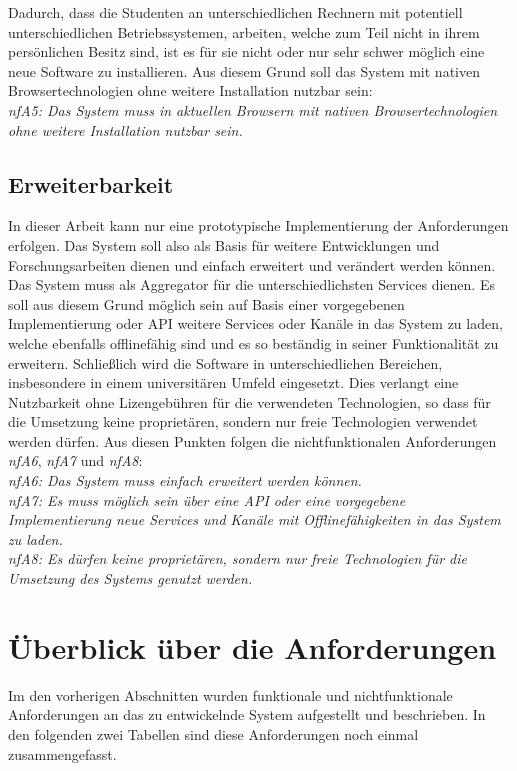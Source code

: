 Dadurch, dass die Studenten an unterschiedlichen Rechnern mit potentiell unterschiedlichen Betriebssystemen, arbeiten, welche zum Teil nicht in ihrem persönlichen Besitz sind, ist es für sie nicht oder nur sehr schwer möglich eine neue Software zu installieren. Aus diesem Grund soll das System mit nativen Browsertechnologien ohne weitere Installation nutzbar sein:\\
\emph{nfA5: Das System muss in aktuellen Browsern mit nativen Browsertechnologien ohne weitere Installation nutzbar sein.}

\subsection{Erweiterbarkeit}
In dieser Arbeit kann nur eine prototypische Implementierung der Anforderungen erfolgen. Das System soll also als Basis für weitere Entwicklungen und Forschungsarbeiten dienen und einfach erweitert und verändert werden können. Das System muss als Aggregator für die unterschiedlichsten Services dienen. Es soll aus diesem Grund möglich sein auf Basis einer vorgegebenen Implementierung oder API weitere Services oder Kanäle in das System zu laden, welche ebenfalls offlinefähig sind und es so beständig in seiner Funktionalität zu erweitern. Schließlich wird die Software in unterschiedlichen Bereichen, insbesondere in einem universitären Umfeld eingesetzt. Dies verlangt eine Nutzbarkeit ohne Lizengebühren für die verwendeten Technologien, so dass für die Umsetzung keine proprietären, sondern nur freie Technologien verwendet werden dürfen. Aus diesen Punkten folgen die nichtfunktionalen Anforderungen \emph{nfA6}, \emph{nfA7} und \emph{nfA8}:\\
\emph{nfA6: Das System muss einfach erweitert werden können.}\\
\emph{nfA7: Es muss möglich sein über eine API oder eine vorgegebene Implementierung neue Services und Kanäle mit Offlinefähigkeiten in das System zu laden.}\\
\emph{nfA8: Es dürfen keine proprietären, sondern nur freie Technologien für die Umsetzung des Systems genutzt werden.}

 
\section{Überblick über die Anforderungen}
Im den vorherigen Abschnitten wurden funktionale und nichtfunktionale Anforderungen an das zu entwickelnde System aufgestellt und beschrieben. In den folgenden zwei Tabellen sind diese Anforderungen noch einmal zusammengefasst.

